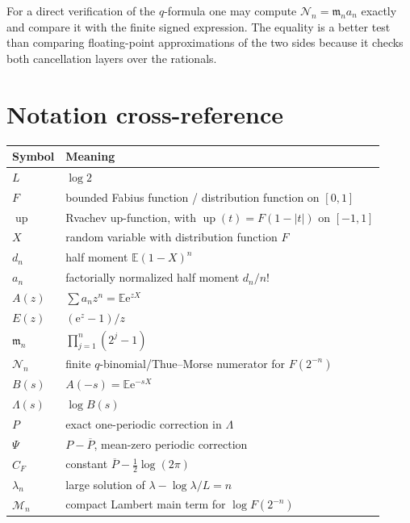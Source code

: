 \documentclass[11pt,oneside]{article}
\theoremstyle{definition}
\theoremstyle{remark}
\newcommand{\Up}{\operatorname{up}}
\newcommand{\e}{\mathrm e}
\newcommand{\E}{\mathbb E}
\newcommand{\M}{\mathfrak m}
\newcommand{\Lam}{\Lambda}
\begin{document}
For a direct verification of the $q$-formula one may compute
$\mathcal N_n=\M_na_n$ exactly and compare it with the finite signed expression.  The equality
is a better test than comparing floating-point approximations of the two sides because it
checks both cancellation layers over the rationals.

\section{Notation cross-reference}
\label{app:notation}

\begingroup\small
\begin{longtable}{@{}ll@{}}
\toprule
Symbol & Meaning\\
\midrule
\endhead
$L$ & $\log2$\\
$F$ & bounded Fabius function / distribution function on $[0,1]$\\
$\Up$ & Rvachev up-function, with $\Up(t)=F(1-|t|)$ on $[-1,1]$\\
$X$ & random variable with distribution function $F$\\
$d_n$ & half moment $\E(1-X)^n$\\
$a_n$ & factorially normalized half moment $d_n/n!$\\
$A(z)$ & $\sum a_nz^n=\E\e^{zX}$\\
$E(z)$ & $(\e^z-1)/z$\\
$\M_n$ & $\prod_{j=1}^n(2^j-1)$\\
$\mathcal N_n$ & finite $q$-binomial/Thue--Morse numerator for $F(2^{-n})$\\
$B(s)$ & $A(-s)=\E\e^{-sX}$\\
$\Lam(s)$ & $\log B(s)$\\
$P$ & exact one-periodic correction in $\Lam$\\
$\Psi$ & $P-\overline P$, mean-zero periodic correction\\
$C_F$ & constant $\overline P-\tfrac12\log(2\pi)$\\
$\lambda_n$ & large solution of $\lambda-\log\lambda/L=n$\\
$\mathcal M_n$ & compact Lambert main term for $\log F(2^{-n})$\\
\bottomrule
\end{longtable}
\endgroup
\end{document}
